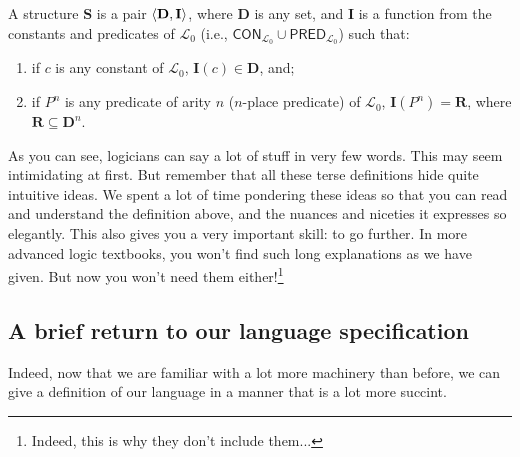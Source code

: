 \begin{defn}
A structure $\mathbf{S}$ is a pair $\langle\mathbf{D}, \mathbf{I}\rangle$, where $\mathbf{D}$ is any set, and $\mathbf{I}$ is a function from the constants and predicates of $\mathcal{L}_0$ (i.e., $\mathsf{CON}_{\mathcal{L}_0} \cup \mathsf{PRED}_{\mathcal{L}_0}$) such that:
%
\begin{enumerate}
	\item if $c$ is any constant of $\mathcal{L}_0$, $\mathbf{I}(c) \in \mathbf{D}$, and;
	\item if $P^n$ is any predicate  of arity $n$ ($n$-place predicate) of $\mathcal{L}_0$, $\mathbf{I}(P^n)=\mathbf{R}$, where $\mathbf{R} \subseteq \mathbf{D}^n$. 
\end{enumerate}
\end{defn}

As you can see, logicians can say a lot of stuff in very few words. This may seem intimidating at first. But remember that all these terse definitions hide quite intuitive ideas. We spent a lot of time pondering these ideas so that you can read and understand the definition above, and the nuances and niceties it expresses so elegantly. This also gives you a very important skill: to go further. In more advanced logic textbooks, you won't find such long explanations as we have given. But now you won't need them either!\footnote{Indeed, this is why they don't include them...}

\subsection{A brief return to our language specification}

Indeed, now that we are familiar with a lot more machinery than before, we can give a definition of our language in a manner that is a lot more succint. 

